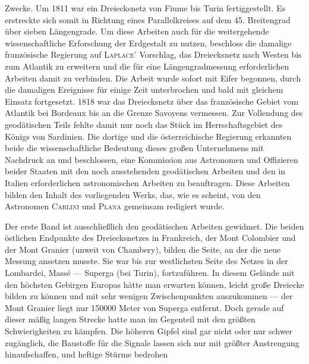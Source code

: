 %
Zwecke. Um 1811 war ein Dreiecksnetz von Fiume bis Turin fertiggestellt. Es erstreckte sich somit in Richtung eines Parallelkreises auf dem 45. Breitengrad über sieben Längengrade. Um diese Arbeiten auch für die weitergehende wissenschaftliche Erforschung der Erdgestalt zu nutzen, beschloss die damalige französische Regierung auf \textsc{Laplace}’ Vorschlag, das Dreiecksnetz nach Westen bis zum Atlantik zu erweitern und die für eine Längengradmessung erforderlichen Arbeiten damit zu verbinden. Die Arbeit wurde sofort mit Eifer begonnen, durch die damaligen Ereignisse für einige Zeit unterbrochen und bald mit gleichem Einsatz fortgesetzt. 1818 war das Dreiecksnetz über das französische Gebiet vom Atlantik bei Bordeaux bis an die Grenze Savoyens vermessen. Zur Vollendung des geodätischen Teils fehlte damit nur noch das Stück im Herrschaftsgebiet des Königs von Sardinien. Die dortige und die österreichische Regierung erkannten beide die wissenschaftliche Bedeutung dieses großen Unternehmens mit Nachdruck an und beschlossen, eine Kommission aus Astronomen und Offizieren beider Staaten mit den noch ausstehenden geodätischen Arbeiten und den in Italien erforderlichen astronomischen Arbeiten zu beauftragen. Diese Arbeiten bilden den Inhalt des vorliegenden Werks, das, wie es scheint, von den Astronomen \textsc{Carlini} und \textsc{Plana} gemeinsam redigiert wurde.

Der erste Band ist ausschließlich den geodätischen Arbeiten gewidmet. Die beiden östlichen Endpunkte des Dreiecksnetzes in Frankreich, der Mont Colombier und der Mont Granier (unweit von Chambery), bilden die Seite, an der die neue Messung ansetzen musste. Sie war bis zur westlichsten Seite des Netzes in der Lombardei, Massé --- Superga (bei Turin), fortzuführen. In diesem Gelände mit den höchsten Gebirgen Europas hätte man erwarten können, leicht große Dreiecke bilden zu können und mit sehr wenigen Zwischenpunkten auszukommen --- der Mont Granier liegt nur 150000 Meter von Superga entfernt. Doch gerade auf dieser mäßig langen Strecke hatte man im Gegenteil mit den größten Schwierigkeiten zu kämpfen. Die höheren Gipfel sind gar nicht oder nur schwer zugänglich, die Baustoffe für die Signale lassen sich nur mit größter Anstrengung hinaufschaffen, und heftige Stürme bedrohen
